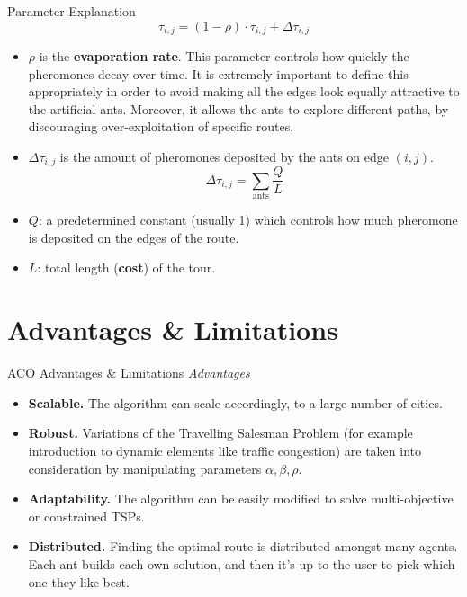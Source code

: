 \documentclass[aspectratio=169,xcolor=dvipsnames, t]{beamer}
\begin{document}
\begin{frame}{Parameter Explanation}
	\vspace{-10mm}
	\[
		\tau_{i,j} = (1 - \rho) \cdot \tau_{i, j} + \Delta \tau_{i,j} 
	\]
	\vspace{-1mm}
	\begin{itemize}
		\item<2-> \( \rho \) is the \textbf{evaporation rate}. This parameter controls how quickly the pheromones decay over time. It is extremely important to define this appropriately in order to avoid making all the edges look equally attractive to the artificial ants. Moreover, it allows the ants to explore different paths, by discouraging over-exploitation of specific routes.
		\item<3-> \( \Delta \tau_{i,j} \) is the amount of pheromones deposited by the ants on edge \( (i,j) \). 
			\[
				\Delta \tau_{i,j} = \sum_{\text{ants}} \frac{Q}{L}
			\]
		\item<4-> \( Q \): a predetermined constant (usually 1) which controls how much pheromone is deposited on the edges of the route.
		\item<5-> \( L \): total length (\textbf{cost}) of the tour.
	\end{itemize}
\end{frame}

\section{Advantages \& Limitations}
\begin{frame}{ACO Advantages \& Limitations}
	\vspace{-5mm}
	\onslide<2-> \textit{Advantages}
	\begin{itemize}
			\item<3-> \textbf{Scalable.} The algorithm can scale accordingly, to a large number of cities.
			\item<4-> \textbf{Robust.} Variations of the Travelling Salesman Problem (for example introduction to dynamic elements like traffic congestion) are taken into consideration by manipulating parameters \( \alpha, \beta, \rho \).
			\item<5-> \textbf{Adaptability.} The algorithm can be easily modified to solve multi-objective or constrained TSPs.
			\item<6-> \textbf{Distributed.} Finding the optimal route is distributed amongst many agents. Each ant builds each own solution, and then it's up to the user to pick which one they like best.
	\end{itemize}
\end{frame}
\end{document}
